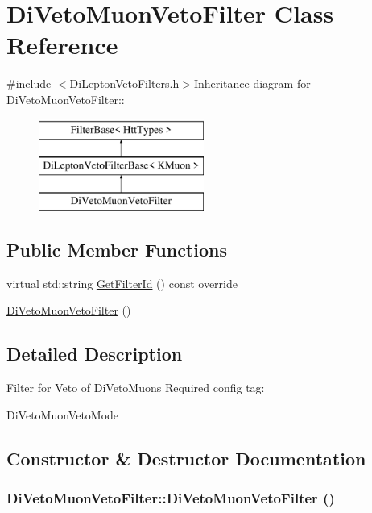 \hypertarget{classDiVetoMuonVetoFilter}{
\section{DiVetoMuonVetoFilter Class Reference}
\label{classDiVetoMuonVetoFilter}
}


{\ttfamily \#include $<$DiLeptonVetoFilters.h$>$}Inheritance diagram for DiVetoMuonVetoFilter::\begin{figure}[H]
\begin{center}
\leavevmode
\includegraphics[height=3cm]{classDiVetoMuonVetoFilter}
\end{center}
\end{figure}
\subsection*{Public Member Functions}
\begin{DoxyCompactItemize}
\item 
virtual std::string \hyperlink{classDiVetoMuonVetoFilter_aae40c3df38f3e1e3661fdd8ccd343341}{GetFilterId} () const override
\item 
\hyperlink{classDiVetoMuonVetoFilter_a0e886d9fa83fa37630724798128cd6b4}{DiVetoMuonVetoFilter} ()
\end{DoxyCompactItemize}


\subsection{Detailed Description}
Filter for Veto of DiVetoMuons Required config tag:
\begin{DoxyItemize}
\item DiVetoMuonVetoMode 
\end{DoxyItemize}

\subsection{Constructor \& Destructor Documentation}
\hypertarget{classDiVetoMuonVetoFilter_a0e886d9fa83fa37630724798128cd6b4}{
\subsubsection[{DiVetoMuonVetoFilter}]{\setlength{\rightskip}{0pt plus 5cm}DiVetoMuonVetoFilter::DiVetoMuonVetoFilter ()}}
\label{classDiVetoMuonVetoFilter_a0e886d9fa83fa37630724798128cd6b4}


